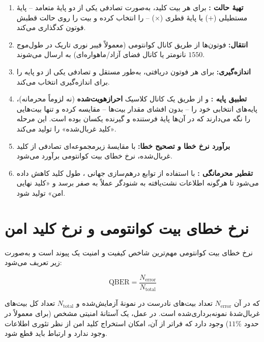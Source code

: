 \begin{enumerate}
\item \textbf{تهیهٔ حالت :}  برای هر بیت کلید، به‌صورت تصادفی یکی از دو پایهٔ متعامد -- پایهٔ مستطیلی ($+$) یا پایهٔ قطری ($\times$) -- را انتخاب کرده و بیت را روی حالت قطبش فوتون کدگذاری می‌کند.
\item \textbf{انتقال:} فوتون‌ها از طریق کانال کوانتومی (معمولاً فیبر نوری تاریک  در طول‌موج $1550$ نانومتر یا کانال فضای آزاد/ماهواره‌ای) به  ارسال می‌شوند.
\item \textbf{اندازه‌گیری:}  برای هر فوتون دریافتی، به‌طور مستقل و تصادفی یکی از دو پایه را برای اندازه‌گیری انتخاب می‌کند.
\item \textbf{تطبیق پایه :}  و  از طریق یک کانال کلاسیک \textbf{احراز‌هویت‌شده} (نه لزوماً محرمانه)، پایه‌های انتخابی خود را -- بدون افشای مقدار بیت‌ها -- مقایسه کرده و تنها بیت‌هایی را نگه می‌دارند که در آن‌ها پایهٔ فرستنده و گیرنده یکسان بوده است. این مرحله «کلید غربال‌شده»  را تولید می‌کند.
\item \textbf{برآورد نرخ خطا و تصحیح خطا:} با مقایسهٔ زیرمجموعه‌ای تصادفی از کلید غربال‌شده، نرخ خطای بیت کوانتومی برآورد می‌شود.
\item \textbf{تقطیر محرمانگی :} با استفاده از توابع درهم‌سازی جهانی ، طول کلید کاهش داده می‌شود تا هرگونه اطلاعات نشت‌یافته به شنودگر عملاً به صفر برسد و «کلید نهایی امن» تولید شود.
\end{enumerate}

\section{نرخ خطای بیت کوانتومی و نرخ کلید امن}
\label{sec:qberrate}

نرخ خطای بیت کوانتومی  مهم‌ترین شاخص کیفیت و امنیت یک پیوند  است و به‌صورت زیر تعریف می‌شود:

\begin{equation}
\label{eq:qber}
\mathrm{QBER} = \frac{N_{\text{error}}}{N_{\text{total}}}
\end{equation}

که در آن $N_{\text{error}}$ تعداد بیت‌های نادرست در نمونهٔ آزمایش‌شده و $N_{\text{total}}$ تعداد کل بیت‌های غربال‌شدهٔ نمونه‌برداری‌شده است. در عمل، یک آستانهٔ امنیتی مشخص (برای  معمولاً در حدود $11\%$) وجود دارد که فراتر از آن، امکان استخراج کلید امن از نظر تئوری اطلاعات وجود ندارد و ارتباط باید قطع شود.

